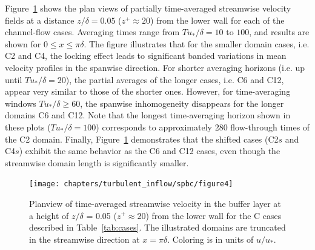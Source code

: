 		Figure~\ref{fig:topviewCHANNEL} shows the plan views of partially time-averaged streamwise velocity fields at a distance $z/\delta = 0.05$ ($z^+ \approx 20$) from the lower wall for each of the channel-flow cases. Averaging times range from $Tu_*/\delta=10$ to $100$, and results are shown for $0\leq x \leq \pi\delta$. The figure illustrates that for the smaller domain cases, i.e. C2 and C4, the locking effect leads to significant banded variations in mean velocity profiles in the spanwise direction. For shorter averaging horizons (i.e. up until $T u_* / \delta = 20$), the partial averages of the longer cases, i.e. C6 and C12, appear very similar to those of the shorter ones. However, for time-averaging windows $Tu_*/\delta \ge 60$, the spanwise inhomogeneity disappears for the longer domains C6 and C12. Note that the longest time-averaging horizon shown in these plots ($Tu_*/\delta=100$) corresponds to approximately 280 flow-through times of the C2 domain. Finally, Figure~\ref{fig:topviewCHANNEL} demonstrates that the shifted cases (C2$s$ and C4$s$) exhibit the same behavior as the C6 and C12 cases, even though the streamwise domain length is significantly smaller. 
		
		\begin{figure}
			\centering
			\texttt{[image: chapters/turbulent\_inflow/spbc/figure4]}
			\caption{Planview of time-averaged streamwise velocity in the buffer layer at a height of $z/\delta$ = 0.05 ($z^+ \approx 20$) from the lower wall for the C cases described in Table~\ref{tab:cases}. The illustrated domains are truncated in the streamwise direction at $x = \pi\delta$. Coloring is in units of $u/u_*$.}
			\label{fig:topviewCHANNEL}
		\end{figure}
		
